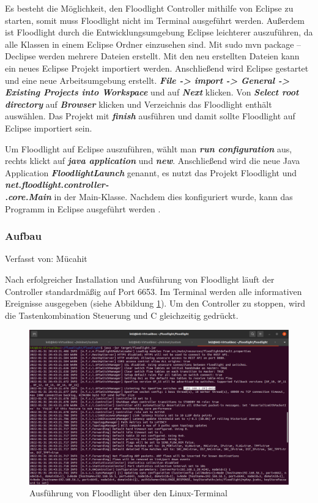 \documentclass[fontsize=12pt,paper=a4,open=any,parskip=half,
  twoside=false,toc=listof,toc=bibliography,fleqn,leqno,
  captions=nooneline,captions=tableabove,british]{scrbook}
\begin{document}
Es besteht die Möglichkeit, den Floodlight Controller mithilfe von Eclipse zu starten, somit muss Floodlight nicht im Terminal ausgeführt werden. Außerdem ist Floodlight durch die Entwicklungsumgebung Eclipse leichterer auszuführen, da alle Klassen in einem Eclipse Ordner einzusehen sind. Mit sudo mvn package –Declipse werden mehrere Dateien erstellt. Mit den neu erstellten Dateien kann ein neues Eclipse Projekt importiert werden. Anschließend wird Eclipse gestartet und eine neue Arbeitsumgebung erstellt. \textit{\textbf{File -> import -> General -> Existing Projects into Workspace}} und auf \textit{\textbf{Next}} klicken. Von \textit{\textbf{Select root directory}} auf \textit{\textbf{Browser}} klicken und Verzeichnis das Floodlight enthält auswählen. Das Projekt mit \textit{\textbf{finish}} ausführen und damit sollte Floodlight auf Eclipse importiert sein.\par
Um Floodlight auf Eclipse auszuführen, wählt man \textit{\textbf{run configuration}} aus, rechts klickt auf \textit{\textbf{java application}} und \textit{\textbf{new}}. Anschließend wird die neue Java Application \textit{\textbf{FloodlightLaunch}} genannt, es nutzt das Projekt Floodlight und \textit{\textbf{net.floodlight.controller-\\.core.Main}} in der Main-Klasse. Nachdem dies konfiguriert wurde, kann das Programm in Eclipse ausgeführt werden \cite{install}.


\subsubsection{Aufbau}
{\tiny Verfasst von: Mücahit\par}
Nach erfolgreicher Installation und Ausführung von Floodlight läuft der Controller standardmäßig auf Port 6653. Im Terminal werden alle informativen Ereignisse ausgegeben (siehe Abbildung \ref{floodlight}). Um den Controller zu stoppen, wird die Tastenkombination Steuerung und C gleichzeitig gedrückt.

\begin{figure}[H]
 \centering
 \includegraphics[width=1.0\textwidth]{Bilder/floodlight}
 \captionsetup{justification=centering,margin=1cm}
 \caption{Ausführung von Floodlight über den Linux-Terminal}
 \label{floodlight}
\end{figure}
\end{document}

